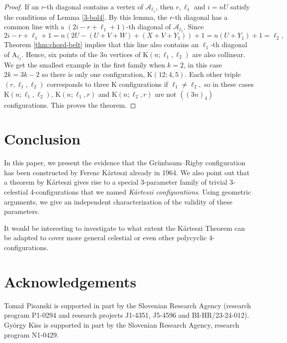 \documentclass[12pt]{article}
\theoremstyle{definition} \newtheorem*{definition}              {Definition}
\theoremstyle{definition} \newtheorem {remark}                   {Remark}
\theoremstyle{definition} \newtheorem*{problem}                {Problem}
\theoremstyle{definition} \newtheorem{example}     [thm]{Example}
\begin{document}
\begin{proof}
\bigskip
If an $r$-th diagonal contains a vertex of $\mathcal{A}_{\ell _1}$, then $r,\ell _1$
and $i=nU$  satisfy the conditions of Lemma \ref{3-bol4}. By this lemma, the $r$-th  diagonal has a common line 
with a $(2i-r+\ell _1+1)$-th diagonal of $\mathcal{A}_{\ell _1}$. Since
$$
2i-r+\ell _1+1=n(2U-( U+V+W) +(X+V+Y_1))+1=n(U+Y_1)+1=\ell_2,
$$
Theorem \ref{thm:chord-belt} implies that this line also contains an $\ell _1$-th diagonal 
of $\mathrm{A}_{\ell _2}$. Hence, six points of the $3n$ vertices of $\mathrm{K}(n;\ell _1,\ell _2)$ are also 
collinear. We get the smallest example in the first family when $k=2$, in this case $2k=3k-2$ so there is only 
one configuration, $\mathrm{K}(12;4,5)$. 
Each other triple $(r,\ell _1,\ell _2)$ corresponds to three K configurations
if $\ell_1\neq \ell _2,$ so in these cases
$\mathrm{K}(n;\ell _1,\ell _2)$, $\mathrm{K}(n;\ell _1,r)$ and $\mathrm{K}(n;\ell _2,r)$ are not $((3n)_4)$ 
configurations. This proves the theorem.
\end{proof}







\section{Conclusion}

In this paper, we present the evidence that the Grünbaum--Rigby configuration has been constructed by 
Ferenc Kárteszi already in 1964. We also point out that a theorem by Kárteszi gives rise to a special 
3-parameter family of trivial 3-celestial 4-configurations that we named \emph{Kárteszi configurations}. 
Using geometric arguments, we give an independent characterization of the validity of these parameters. 

It would be interesting to investigate to what extent the Kárteszi Theorem can be adapted to cover more 
general celestial or even other polycyclic 4-configurations.


\section*{Acknowledgements}
Toma\v{z} Pisanski is supported in part by the Slovenian Research Agency (research program P1-0294 and research projects J1-4351, J5-4596 and BI-HR/23-24-012).
Gy\"orgy Kiss is supported in part by the Slovenian Research Agency, research program N1-0429.
\bigskip
\end{document}

